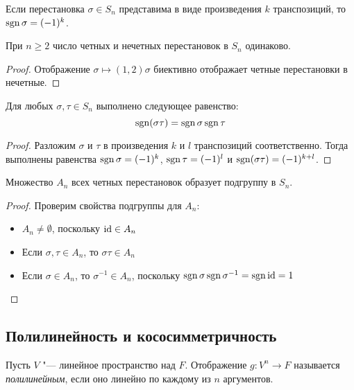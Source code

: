 \begin{corollary}
	Если перестановка $\sigma \in S_n$ представима в виде произведения $k$ транспозиций, то $\operatorname{sgn}\sigma = (-1)^k$.
\end{corollary}

\begin{corollary}
	При $n \ge 2$ число четных и нечетных перестановок в $S_n$ одинаково.
\end{corollary}

\begin{proof}
	Отображение $\sigma \mapsto (1, 2)\sigma$ биективно отображает четные перестановки в нечетные.
\end{proof}

\begin{proposition}
	Для любых $\sigma, \tau \in S_n$ выполнено следующее равенство:
	\[\operatorname{sgn}(\sigma\tau) = \operatorname{sgn}\sigma \operatorname{sgn}\tau\]
\end{proposition}

\begin{proof}
	Разложим $\sigma$ и $\tau$ в произведения $k$ и $l$ транспозиций соответственно. Тогда выполнены равенства $\operatorname{sgn}\sigma = (-1)^k$, $\operatorname{sgn}\tau = (-1)^l$ и $\operatorname{sgn}(\sigma\tau) = (-1)^{k + l}$.
\end{proof}

\begin{corollary}
	Множество $A_n$ всех четных перестановок образует подгруппу в $S_n$.
\end{corollary}

\begin{proof}
	Проверим свойства подгруппы для $A_n$:
	\begin{itemize}
		\item $A_n \ne \emptyset$, поскольку $\mathrm{id} \in A_n$
		\item Если $\sigma, \tau \in A_n$, то $\sigma\tau \in A_n$
		\item Если $\sigma \in A_n$, то $\sigma^{-1} \in A_n$, поскольку $\operatorname{sgn}\sigma \operatorname{sgn}\sigma^{-1} = \operatorname{sgn} \mathrm{id} = 1$\qedhere
	\end{itemize}
\end{proof}

\subsection{Полилинейность и кососимметричность}

\begin{definition}
	Пусть $V$ "--- линейное пространство над $F$. Отображение $g: V^n \rightarrow F$ называется \textit{полилинейным}, если оно линейно по каждому из $n$ аргументов.
\end{definition}

